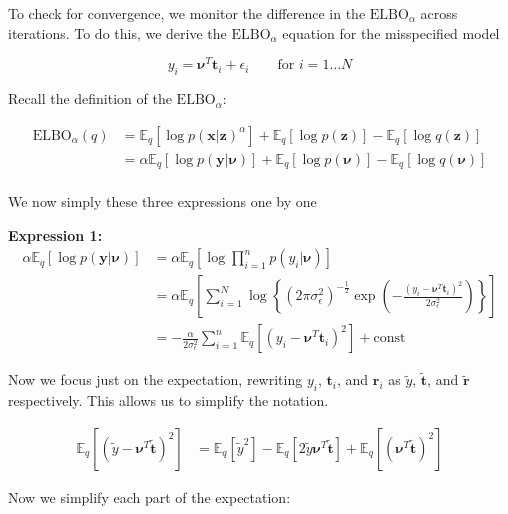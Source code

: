 \documentclass[letterpaper,12pt]{article}
\newcommand{\lc}{\left \{} %
\newcommand{\rc}{\right \}} %
\newcommand{\lp}{\left (} %
\newcommand{\rp}{\right )} %
\newcommand{\lb}{\left [} %
\newcommand{\rb}{\right ]} %
\newcommand{\pz}{\ensuremath{p(\boldsymbol{z})}}
\newcommand{\pxgivenz}{\ensuremath{p(\boldsymbol{x} | \boldsymbol{z})}}
\newcommand{\qz}{\ensuremath{q(\boldsymbol{z})}}
\newcommand{\sigmaepsilon}{\sigma_\epsilon^2} %
\newcommand{\nuv}{\boldsymbol{\nu}} %
\newcommand{\ti}{\boldsymbol{t}_i} %
\newcommand{\ri}{\boldsymbol{r}_i} %
\newcommand{\ytilde}{\ensuremath{\tilde{y}}} %
\newcommand{\ttilde}{\ensuremath{\tilde{\boldsymbol{t}}}} %
\newcommand{\rtilde}{\ensuremath{\tilde{\boldsymbol{r}}}} %
\newcommand{\elbo}{\ensuremath{\mathrm{ELBO}}}
\newcommand{\E}{\mathbb{E}_q}
\newcommand{\el}{\left[} %
\newcommand{\er}{\right]} %
\begin{document}
To check for convergence, we monitor the difference in the $\elbo_\alpha$ across iterations. To do this, we derive the $\elbo_\alpha$ equation for the misspecified model

\begin{equation}
    y_i=\mathbf{\nu}^T\mathbf{t}_i+\epsilon_i \qquad \text{for }i=1\ldots N 
\end{equation}

Recall the definition of the $\elbo_\alpha$:

\begin{equation}
\begin{split}
    \elbo_\alpha(q) &= \E \el \log \pxgivenz^\alpha \er + \E \el \log \pz \er   - \E \el \log \qz \er\\
    &= \alpha \E \lb \log p(\boldsymbol{y} | \nuv) \rb + \E \lb \log p(\nuv) \rb  - \E \lb \log q(\nuv) \rb \\
\end{split}
\end{equation}

We now simply these three expressions one by one

\textbf{Expression 1:}
\begin{equation}
\begin{split}
    \alpha \E \lb \log p(\boldsymbol{y} | \nuv) \rb &= \alpha \E \lb \log \prod_{i=1}^n p(y_i | \nuv) \rb \\
    &= \alpha \E \lb \sum \limits_{i=1}^N \log \lc (2 \pi \sigma_\epsilon^2)^{-\frac{1}{2}} \exp \left(- \frac{\left(y_i - \nuv^T \ti \right)^2}{2 \sigma_\epsilon^2} \right) \rc \rb \\
    &= -\frac{\alpha}{2 \sigmaepsilon} \sum_{i=1}^n \E \lb \lp y_i - \nuv^T \ti \rp^2 \rb + \textrm{const}
\end{split}
\end{equation}

Now we focus just on the expectation, rewriting $y_i$, $\ti$, and $\ri$ as $\ytilde$, $\ttilde$, and $\rtilde$ respectively. This allows us to simplify the notation.

\begin{equation}
\begin{split}
    \E \lb \lp \ytilde -\nuv^T \ttilde \rp ^2 \rb &= \E \lb \ytilde^2 \rb - \E \lb 2 \ytilde \nuv^T \ttilde \rb + \E \lb ( \nuv^T \ttilde)^2 \rb 
\end{split}
\end{equation}

Now we simplify each part of the expectation:
\end{document}

